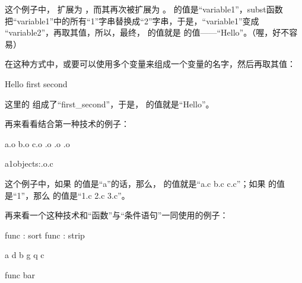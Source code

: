 \documentclass[a4paper,10pt]{sphinxmanual}
\begin{document}
这个例子中，  扩展为  ，而其再次被扩展为
 。  的值是“variable1”，subst函数把“variable1”中的所有“1”字串替换成“2”字串，于是，“variable1”变成 “variable2”，再取其值，所以，最终，
 的值就是  的值——“Hello”。（喔，好不容易）

在这种方式中，或要可以使用多个变量来组成一个变量的名字，然后再取其值：

\begin{sphinxVerbatim}[commandchars=\\\{\}]
  Hello
  first
  second
  
\end{sphinxVerbatim}

这里的  组成了“first\_second”，于是，  的值就是“Hello”。

再来看看结合第一种技术的例子：

\begin{sphinxVerbatim}[commandchars=\\\{\}]
  a.o b.o c.o
  .o .o .o

  a1\PYGZus{}objects:.o.c
\end{sphinxVerbatim}

这个例子中，如果  的值是“a”的话，那么，  的值就是“a.c b.c c.c”；如果  的值是“1”，那么  的值是“1.c 2.c 3.c”。

再来看一个这种技术和“函数”与“条件语句”一同使用的例子：

\begin{sphinxVerbatim}[commandchars=\\\{\}]
    func : sort
    func : strip

  a d b g q c

  func bar
\end{sphinxVerbatim}
\end{document}
